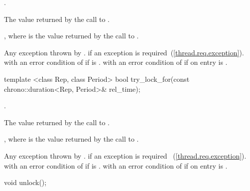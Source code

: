 \begin{itemdescr}
\pnum
\effects {}.

\pnum
\returns The value returned by the call to
.

\pnum
\postconditions {}, where  is the value returned by
the call to .

\pnum
\throws Any exception thrown by .
 if an exception is required~(\ref{thread.req.exception}).
 with an error condition of
 if  is .
 with an error condition of
 if on entry  is .
\end{itemdescr}

%
%
\begin{itemdecl}
template <class Rep, class Period>
  bool try_lock_for(const chrono::duration<Rep, Period>& rel_time);
\end{itemdecl}

\begin{itemdescr}
\pnum
\effects {}.

\pnum
\returns The value returned by the call to .

\pnum
\postconditions {}, where  is the value returned by the call to .

\pnum
\throws Any exception thrown by .  if an exception is required ~(\ref{thread.req.exception}).  with an error condition of  if  is .  with an error condition of  if on entry  is .
\end{itemdescr}

%
%
\begin{itemdecl}
void unlock();
\end{itemdecl}


